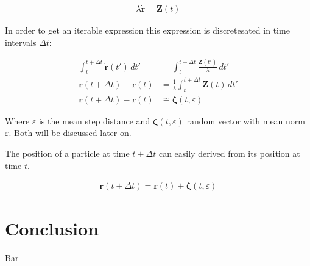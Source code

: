 \documentclass[a4paper, parskip=half]{scrartcl}
\begin{document}
\begin{align}
\lambda\dot{\mathbf{r}} = \mathbf{Z}(t)
\end{align}

In order to get an iterable expression this expression is discretesated in time intervals $\Delta t$:

\begin{align}
\int_t^{t+ \Delta t} \dot{\mathbf{r}}(t')\, dt' &= \int_t^{t+ \Delta t} \frac{\mathbf{Z}(t')}{\lambda}\, dt' \\
\mathbf{r}(t + \Delta t) - \mathbf{r}(t) &= \frac{1}{\lambda} \int_t^{t+ \Delta t} \mathbf{Z}(t)\, dt'\\
\mathbf{r}(t + \Delta t) - \mathbf{r}(t) &\cong \boldsymbol{\zeta}(t, \varepsilon)
\end{align}

Where $\varepsilon$ is the mean step distance and $\boldsymbol{\zeta}(t, \varepsilon)$ random vector with mean norm $\varepsilon$.
Both will be discussed later on.

The position of a particle at time $t + \Delta t$ can easily derived from its position at time $t$.

\begin{align}
\mathbf{r}(t + \Delta t) = \mathbf{r}(t) + \boldsymbol{\zeta}(t, \varepsilon)
\end{align}


 
\section{Conclusion}
Bar
\end{document}
